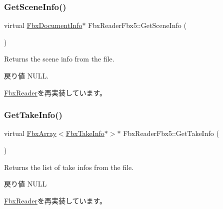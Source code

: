 \mbox{\label{class_fbx_reader_fbx5_af685112183765e2a278bbbc898374074}} 
\subsubsection{\texorpdfstring{Get\+Scene\+Info()}{GetSceneInfo()}}
{\footnotesize\ttfamily virtual \hyperlink{class_fbx_document_info}{Fbx\+Document\+Info}$\ast$ Fbx\+Reader\+Fbx5\+::\+Get\+Scene\+Info (\begin{DoxyParamCaption}{ }\end{DoxyParamCaption})\hspace{0.3cm}{\ttfamily [virtual]}}

Returns the scene info from the file. \begin{DoxyReturn}{戻り値}
N\+U\+LL. 
\end{DoxyReturn}


\hyperlink{class_fbx_reader_acb928634641ad5f99d709478c7a234be}{Fbx\+Reader}を再実装しています。

\mbox{\label{class_fbx_reader_fbx5_a4680a5c4695d3692582d3ca8db71cd01}} 
\subsubsection{\texorpdfstring{Get\+Take\+Info()}{GetTakeInfo()}}
{\footnotesize\ttfamily virtual \hyperlink{class_fbx_array}{Fbx\+Array}$<$\hyperlink{class_fbx_take_info}{Fbx\+Take\+Info}$\ast$$>$$\ast$ Fbx\+Reader\+Fbx5\+::\+Get\+Take\+Info (\begin{DoxyParamCaption}{ }\end{DoxyParamCaption})\hspace{0.3cm}{\ttfamily [virtual]}}

Returns the list of take infos from the file. \begin{DoxyReturn}{戻り値}
N\+U\+LL 
\end{DoxyReturn}


\hyperlink{class_fbx_reader_a9d7b40684bb3181219945eb0c73fb9d1}{Fbx\+Reader}を再実装しています。

\mbox{\label{class_fbx_reader_fbx5_a297ed289a6d5e55f33540d8efb4bfd0b}} 
